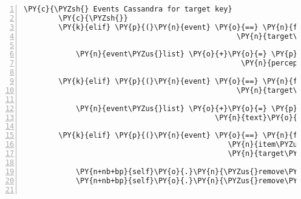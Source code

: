 \begin{Verbatim}[commandchars=\\\{\},numbers=left,firstnumber=1,stepnumber=1]
        \PY{c}{\PYZsh{} Events Cassandra for target key}
        \PY{c}{\PYZsh{}}
        \PY{k}{elif} \PY{p}{(}\PY{n}{event} \PY{o}{==} \PY{n}{fabula}\PY{o}{.}\PY{n}{TriesToLookAtEvent}\PY{p}{(}\PY{n}{identifier}\PY{o}{=}\PY{n}{ID\PYZus{}CASSANDRA}\PY{p}{,}
                                                 \PY{n}{target\PYZus{}identifier}\PY{o}{=}\PY{l+s}{\PYZsq{}}\PY{l+s}{key}\PY{l+s}{\PYZsq{}}\PY{p}{)}\PY{p}{)}\PY{p}{:}

            \PY{n}{event\PYZus{}list} \PY{o}{+}\PY{o}{=} \PY{p}{[}\PY{n}{fabula}\PY{o}{.}\PY{n}{PerceptionEvent}\PY{p}{(}\PY{n}{identifier}\PY{o}{=}\PY{n}{ID\PYZus{}CASSANDRA}\PY{p}{,}
                                                  \PY{n}{perception}\PY{o}{=}\PY{l+s}{\PYZsq{}}\PY{l+s}{Ein güldener Schlüssel! Etwas alt, aber hübsch.}\PY{l+s}{\PYZsq{}}\PY{p}{)}\PY{p}{]}

        \PY{k}{elif} \PY{p}{(}\PY{n}{event} \PY{o}{==} \PY{n}{fabula}\PY{o}{.}\PY{n}{TriesToPickUpEvent}\PY{p}{(}\PY{n}{identifier}\PY{o}{=}\PY{n}{ID\PYZus{}CASSANDRA}\PY{p}{,}
                                                 \PY{n}{target\PYZus{}identifier}\PY{o}{=}\PY{l+s}{\PYZsq{}}\PY{l+s}{key}\PY{l+s}{\PYZsq{}}\PY{p}{)}\PY{p}{)}\PY{p}{:}

            \PY{n}{event\PYZus{}list} \PY{o}{+}\PY{o}{=} \PY{p}{[}\PY{n}{fabula}\PY{o}{.}\PY{n}{SaysEvent}\PY{p}{(}\PY{n}{identifier}\PY{o}{=}\PY{n}{ID\PYZus{}CASSANDRA}\PY{p}{,}
                                            \PY{n}{text}\PY{o}{=}\PY{l+s}{\PYZsq{}}\PY{l+s}{Ich fand einen güldenen Schlüssel und trage ihn bei mir.}\PY{l+s}{\PYZsq{}}\PY{p}{)}\PY{p}{]}

        \PY{k}{elif} \PY{p}{(}\PY{n}{event} \PY{o}{==} \PY{n}{fabula}\PY{o}{.}\PY{n}{TriesToDropEvent}\PY{p}{(}\PY{n}{identifier}\PY{o}{=}\PY{n}{ID\PYZus{}CASSANDRA}\PY{p}{,}
                                               \PY{n}{item\PYZus{}identifier}\PY{o}{=}\PY{l+s}{\PYZsq{}}\PY{l+s}{key}\PY{l+s}{\PYZsq{}}\PY{p}{,}
                                               \PY{n}{target\PYZus{}identifier}\PY{o}{=}\PY{l+s}{\PYZsq{}}\PY{l+s}{door}\PY{l+s}{\PYZsq{}}\PY{p}{)}\PY{p}{)}\PY{p}{:}

            \PY{n+nb+bp}{self}\PY{o}{.}\PY{n}{\PYZus{}remove\PYZus{}sentence}\PY{p}{(}\PY{n}{ID\PYZus{}KUNI}\PY{p}{,} \PY{l+s}{\PYZsq{}}\PY{l+s}{Ich hab den Eingang zum Gnomenweg gefunden! Aber er ist verschlossen.}\PY{l+s}{\PYZsq{}}\PY{p}{)}
            \PY{n+nb+bp}{self}\PY{o}{.}\PY{n}{\PYZus{}remove\PYZus{}sentence}\PY{p}{(}\PY{n}{ID\PYZus{}CASSANDRA}\PY{p}{,} \PY{l+s}{\PYZsq{}}\PY{l+s}{Ich glaube, ich hab den Eingang zum Gnomenweg gefunden.}\PY{l+s}{\PYZsq{}}\PY{p}{)}


\end{Verbatim}
